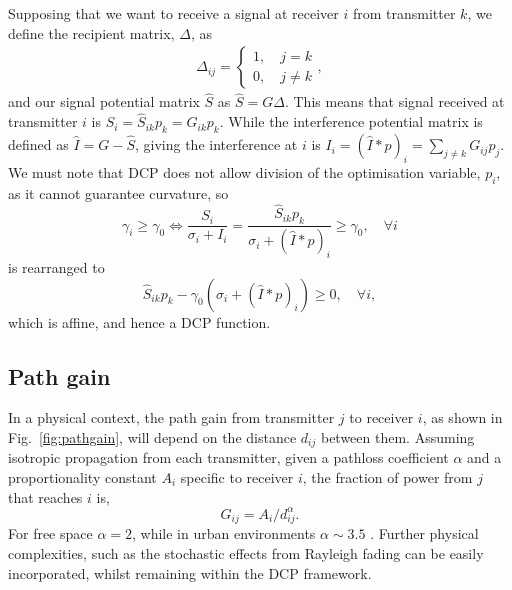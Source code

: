 \documentclass[twocolumn,secnumarabic,amssymb, nobibnotes, aps, prl,superscriptaddress]{revtex4-1}
\begin{document}
Supposing that we want to receive a signal at receiver $i$ from transmitter $k$, we define the recipient matrix, $\Delta$, as
\begin{align*}
\Delta_{ij} = \begin{cases}
1, \quad j=k\\
0, \quad j\neq k
\end{cases},
\end{align*}
and our signal potential matrix $\hat{S}$ as $\hat{S} = G\Delta$.  This means that signal received at transmitter $i$ is $S_i = \hat{S}_{ik}p_k = G_{ik}p_k$.
While the interference potential matrix is defined as $\hat{I} = G-\hat{S}$, giving the interference at $i$ is $I_i = (\hat{I}*p)_i = \sum_{j\neq k}G_{ij}p_j$. We must note that DCP does not allow division of the optimisation variable, $p_i$, as it cannot guarantee curvature, so  
\begin{equation*}
  \gamma_i \geqslant \gamma_0\Longleftrightarrow  \frac{S_i}{\sigma_i + I_i} = \frac{\hat{S}_{ik}p_k}{\sigma_i+(\hat{I}*p)_i} \geqslant \gamma_0, \quad \forall i
\end{equation*}
is rearranged to
\begin{equation*}
\hat{S}_{ik}p_k-\gamma_0(\sigma_i + (\hat{I}*p)_i)\geqslant 0, \quad \forall i,
\end{equation*} 
which is affine, and hence a DCP function.

\subsection{Path gain}
\noindent In a physical context, the path gain from transmitter $j$ to receiver $i$, as shown in Fig.~\ref{fig:pathgain}, will depend on the distance $d_{ij}$ between them. Assuming isotropic propagation from each transmitter, given a pathloss coefficient $\alpha$ and a proportionality constant $A_i$ specific to receiver $i$, the fraction of power from $j$ that reaches $i$ is,
\begin{equation}
G_{ij} = A_i/d_{ij}^\alpha.
\end{equation}
For free space $\alpha = 2$, while in urban environments $\alpha \sim 3.5$ \cite{hata1980}. Further physical complexities, such as the stochastic effects from Rayleigh fading can be easily incorporated, whilst remaining within the DCP framework.
\end{document}
